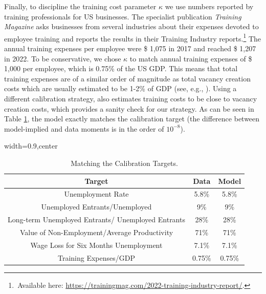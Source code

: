 \documentclass[12pt]{article} %
\theoremstyle{definition}
\begin{document}
Finally, to discipline the training cost parameter $\kappa$ we use numbers reported by training professionals for US businesses.
The specialist publication \textit{Training Magazine} asks businesses from several industries about their expenses devoted to employee training and reports the results in their Training Industry reports.\footnote{\,Available here: \url{https://trainingmag.com/2022-training-industry-report/}.}
The annual training expenses per employee were \$ 1,075 in 2017 and reached \$ 1,207 in 2022.
To be conservative, we chose $\kappa$ to match annual training expenses of \$ 1,000 per employee, which is 0.75\% of the US GDP.
This means that total training expenses are of a similar order of magnitude as total vacancy creation costs which are usually estimated to be 1-2\% of GDP (see, e.g., \citealt{michaillat2021beveridgean}).
Using a different calibration strategy, \cite{masui2023provision} also estimates training costs to be close to vacancy creation costs, which provides a sanity check for our strategy.
As can be seen in Table \ref{table_calibration_targets}, the model exactly matches the calibration target (the difference between model-implied and data moments is in the order of $10^{-8}$).


\begin{table}[h!]
\centering
\begin{adjustbox}{width=0.9\columnwidth,center}

 \begin{tabular}{||c c c||} 
 \hline
 \textbf{Target} & \textbf{Data} & \textbf{Model} \\  
 \hline\hline
  Unemployment Rate & 5.8\%  & 5.8\% \\
  Unemployed Entrants/Unemployed & 9\% & 9\%  \\ 
  Long-term Unemployed Entrants/ Unemployed Entrants & 28\% & 28\% \\
  Value of Non-Employment/Average Productivity & 71\% & 71\% \\
  Wage Loss for Six Months Unemployment & 7.1\%  & 7.1\% \\
  Training Expenses/GDP & 0.75\% & 0.75\% \\ [1ex] 
 \hline
 \end{tabular}
\end{adjustbox}
  \caption{Matching the Calibration Targets.} \label{table_calibration_targets}
\end{table} 
\end{document}
